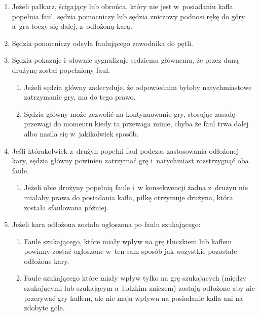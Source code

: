 \documentclass[12pt,a4paper]{article}
\renewcommand{\paragraph}[1]{
  \oldparagraph{#1}%
  \leftskip2.8cm
}
\begin{document}
\paragraph{Ogłaszanie odłożonej kary}

\begin{enumerate}
	\item
	      Jeżeli pałkarz, ścigający lub obrońca, który nie jest w~posiadaniu
	      kafla popełnia faul, sędzia pomocniczy lub sędzia zniczowy podnosi
	      rękę do góry a~gra toczy się dalej, z~odłożoną karą.
	\item
	      Sędzia pomocniczy odsyła faulującego zawodnika do pętli.
	\item
	      Sędzia pokazuje i~słownie sygnalizuje sędziemu głównemu, że przez
	      daną drużynę został popełniony faul.

	      \begin{enumerate}
		      \item
		            Jeżeli sędzia główny zadecyduje, że odpowiednim byłoby
		            natychmiastowe zatrzymanie gry, ma do tego prawo.
		      \item
		            Sędzia główny może zezwolić na kontynuowanie gry, stosując zasadę
		            przewagi do momentu kiedy ta przewaga minie, chyba że faul trwa
		            dalej albo nasila się w~jakikolwiek sposób.
	      \end{enumerate}
	\item
	      Jeśli którakolwiek z~drużyn popełni faul podczas zastosowania odłożonej kary, sędzia główny powinien zatrzymać grę i~natychmiast
	      rozstrzygnąć oba faule.

	      \begin{enumerate}
		      \item
		            Jeżeli obie drużyny popełnią faule i~w konsekwencji żadna z~drużyn
		            nie miałaby prawa do posiadania kafla, piłkę otrzymuje drużyna,
		            która została sfaulowana później.
	      \end{enumerate}
	\item
	      Jeżeli kara odłożona została ogłoszona po faulu szukającego:

	      \begin{enumerate}
		      \item
		            Faule szukającego, które miały wpływ na grę tłuczkiem lub kaflem
		            powinny zostać ogłoszone w~ten sam sposób jak wszystkie pozostałe
		            odłożone kary.
		      \item
		            Faule szukającego które miały wpływ tylko na grę szukających (między
		            szukającymi lub szukającym a~ludzkim zniczem) zostają odłożone aby
		            nie przerywać gry kaflem, ale nie mają wpływu na posiadanie kafla
		            ani na zdobyte gole.
	      \end{enumerate}
\end{enumerate}
\end{document}
